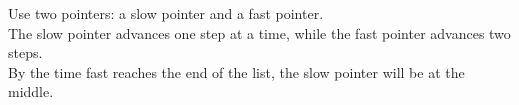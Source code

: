 \documentclass[preview]{standalone}
\begin{document}
Use two pointers: a slow pointer and a fast pointer.\\The slow pointer advances one step at a time, while the fast pointer advances two steps.\\By the time fast reaches the end of the list, the slow pointer will be at the middle.\\
\end{document}
